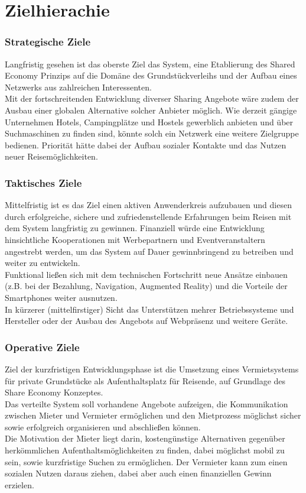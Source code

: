 
\section{Zielhierachie}

\subsubsection{Strategische Ziele}
Langfristig gesehen ist das oberste Ziel das System, eine Etablierung des Shared Economy Prinzips auf die Domäne des Grundstückverleihs und der Aufbau eines Netzwerks aus zahlreichen Interessenten.\\
Mit der fortschreitenden Entwicklung diverser Sharing Angebote wäre zudem der Ausbau einer globalen Alternative solcher Anbieter möglich. Wie derzeit gängige Unternehmen Hotels, Campingplätze und Hostels gewerblich anbieten und über Suchmaschinen zu finden sind, könnte solch ein Netzwerk eine weitere Zielgruppe bedienen. Priorität hätte dabei der Aufbau sozialer Kontakte und das Nutzen neuer Reisemöglichkeiten.


\subsubsection{Taktisches Ziele}
Mittelfristig ist es das Ziel einen aktiven Anwenderkreis aufzubauen und diesen durch erfolgreiche, sichere und zufriedenstellende Erfahrungen beim Reisen mit dem System langfristig zu gewinnen.
Finanziell würde eine Entwicklung hinsichtliche Kooperationen mit Werbepartnern und Eventveranstaltern angestrebt werden, um das System auf Dauer gewinnbringend zu betreiben und weiter zu entwickeln. \\
Funktional ließen sich mit dem technischen Fortschritt neue Ansätze einbauen (z.B. bei der Bezahlung, Navigation, Augmented Reality) und die Vorteile der Smartphones weiter ausnutzen. \\
In kürzerer (mittelfirstiger) Sicht das Unterstützen mehrer Betriebssysteme und Hersteller oder der Ausbau des Angebots auf Webpräsenz und weitere Geräte.


\subsubsection{Operative Ziele}
Ziel der kurzfristigen Entwicklungsphase ist die Umsetzung eines Vermietsystems für private Grundstücke als Aufenthaltsplatz für Reisende, auf Grundlage des Share Economy Konzeptes.\\
Das verteilte System soll vorhandene Angebote aufzeigen, die Kommunikation zwischen Mieter und Vermieter ermöglichen und den Mietprozess möglichst sicher sowie erfolgreich organisieren und abschließen können.\\
Die Motivation der Mieter liegt darin, kostengünstige Alternativen gegenüber herkömmlichen Aufenthaltsmöglichkeiten zu finden, dabei möglichst mobil zu sein, sowie kurzfristige Suchen zu ermöglichen. Der Vermieter kann zum einen sozialen Nutzen daraus ziehen, dabei aber auch einen finanziellen Gewinn erzielen. 


